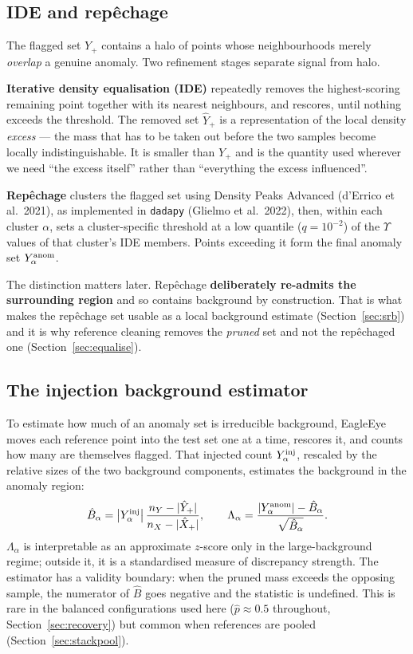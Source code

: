 \documentclass[11pt,a4paper]{article}
\newcommand{\Ups}{\Upsilon}                  %
\newcommand{\phat}{\hat{p}}                  %
\newcommand{\Ups}{\Upsilon}
\newcommand{\phat}{\hat{p}}
\newcommand{\Bhat}{\hat{B}}
\begin{document}
\subsection{IDE and rep\^echage}
\label{sec:ide}

The flagged set $Y_+$ contains a halo of points whose neighbourhoods merely \emph{overlap} a
genuine anomaly. Two refinement stages separate signal from halo.

\textbf{Iterative density equalisation (IDE)} repeatedly removes the highest-scoring remaining
point together with its nearest neighbours, and rescores, until nothing exceeds the threshold.
The removed set $\hat{Y}_+$ is a representation of the local density \emph{excess} --- the mass
that has to be taken out before the two samples become locally indistinguishable. It is smaller
than $Y_+$ and is the quantity used wherever we need ``the excess itself'' rather than
``everything the excess influenced''.

\textbf{Rep\^echage} clusters the flagged set using Density Peaks Advanced (d'Errico et al.\
2021), as implemented in \texttt{dadapy} (Glielmo et al.\ 2022), then, within each cluster
$\alpha$, sets a cluster-specific threshold at a low quantile ($q = 10^{-2}$) of the $\Ups$ values
of that cluster's IDE members. Points exceeding it form the final anomaly set
$Y^{\rm anom}_\alpha$.

The distinction matters later. Rep\^echage \textbf{deliberately re-admits the surrounding region}
and so contains background by construction. That is what makes the rep\^echage set usable as a
local background estimate (Section~\ref{sec:srb}) and it is why reference cleaning removes the
\emph{pruned} set and not the rep\^echaged one (Section~\ref{sec:equalise}).

\subsection{The injection background estimator}
\label{sec:eq9}

To estimate how much of an anomaly set is irreducible background, EagleEye moves each reference
point into the test set one at a time, rescores it, and counts how many are themselves flagged.
That injected count $Y^{\rm inj}_\alpha$, rescaled by the relative sizes of the two background
components, estimates the background in the anomaly region:
%
\begin{equation}
\Bhat_\alpha = \left|Y^{\rm inj}_\alpha\right|
               \frac{n_Y - |\hat{Y}_+|}{n_X - |\hat{X}_+|},
\qquad
\Lambda_\alpha = \frac{|Y^{\rm anom}_\alpha| - \Bhat_\alpha}{\sqrt{\Bhat_\alpha}}.
\label{eq:injection}
\end{equation}
%
$\Lambda_\alpha$ is interpretable as an approximate $z$-score only in the large-background regime;
outside it, it is a standardised measure of discrepancy strength. The estimator has a validity
boundary: when the pruned mass exceeds the opposing sample, the numerator of $\Bhat$ goes negative
and the statistic is undefined. This is rare in the balanced configurations used here
($\phat \approx 0.5$ throughout, Section~\ref{sec:recovery}) but common when references are pooled
(Section~\ref{sec:stackpool}).
\end{document}
